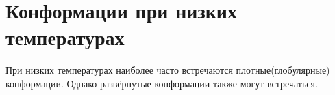 \section{Конформации при низких температурах}
При низких температурах наиболее часто встречаются плотные(глобулярные) конформации. Однако развёрнутые конформации также могут встречаться.


